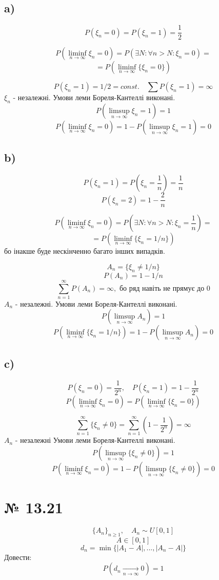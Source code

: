 \documentclass[11pt, a4paper]{article} %
\begin{document}
\subsection*{a)}
$$P(\xi_n = 0) = P(\xi_n = 1) = \frac{1}{2}$$

$$P(\liminf_{n\to\infty} \xi_n = 0) = P(\exists N: \forall n>N: \xi_n = 0) =$$
$$= P(\liminf_{n\to\infty} \{\xi_n = 0\})$$

$$P(\xi_n = 1) = 1/2 = const.\quad \sum P(\xi_n = 1) = \infty$$
$\xi_n$ - незалежні. Умови леми Бореля-Кантеллі виконані.
$$P(\limsup_{n\to\infty}\xi_n = 1) = 1$$
$$P(\liminf_{n\to\infty} \xi_n = 0) = 1 - P(\limsup_{n\to\infty}\xi_n = 1) = 0$$

\subsection*{b)}
$$P(\xi_n = 1) = P(\xi_n = \frac{1}{n}) = \frac{1}{n}$$
$$P(\xi_n = 2 ) = 1 - \frac{2}{n}$$

$$P(\liminf_{n\to\infty} \xi_n = 0) = P(\exists N: \forall n>N: \xi_n = \frac{1}{n}) =$$
$$= P(\liminf_{n\to\infty} \{\xi_n = 1/n\})$$
бо інакше буде нескінченно багато інших випадків.

$$A_n = \{\xi_n \ne 1/n\}$$
$$P(A_n) = 1-1/n$$
$$\sum_{n=1}^\infty P(A_n) = \infty, \text{ бо ряд навіть не прямує до 0}$$
$A_n$ - незалежні. Умови леми Бореля-Кантеллі виконані.
$$P(\limsup_{n\to\infty}A_n) = 1$$
$$P(\liminf_{n\to\infty} \{\xi_n = 1/n\}) = 1 - P(\limsup_{n\to\infty}A_n) = 0$$

\subsection*{c)}
$$P(\xi_n = 0) = \frac{1}{2^n},\quad P(\xi_n=1) = 1 - \frac{1}{2^n}$$
$$P(\liminf_{n\to\infty} \xi_n = 0) = P(\liminf_{n\to\infty} \{\xi_n = 0\}) $$

$$\sum_{n=1}^\infty \{\xi_n \ne 0\} = \sum_{n=1}^\infty \left(1-\frac{1}{2^n}\right) = \infty$$
$A_n$ - незалежні
Умови леми Бореля-Кантеллі виконані.
$$P(\limsup_{n\to\infty} \{\xi_n \ne 0\}) = 1$$
$$P(\liminf_{n\to\infty} \xi_n = 0) = 1 - P(\limsup_{n\to\infty} \{\xi_n \ne 0\}) = 0$$


\section*{№ 13.21}

\begin{mdframed}
    $$\{A_n\}_{n\ge 1}, \quad A_n \sim U[0,1]$$
    $$A \in [0,1]$$
    $$d_n = \min\{|A_1-A|, ... , |A_n-A|\}$$
    Довести:
    $$P(d_n \xrightarrow[n \to \infty]{} 0) = 1$$
\end{mdframed}
\end{document}

